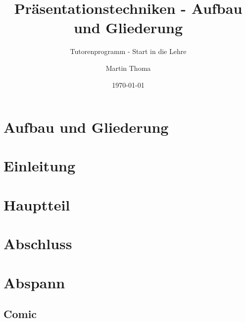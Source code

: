 \documentclass[usepdftitle=false,hyperref={pdfpagelabels=false}]{beamer}
\institute{Fakultät für Informatik}
\newcommand\titleText{Präsentationstechniken - Aufbau und Gliederung}
\begin{document}
\title{\titleText}
\subtitle{Tutorenprogramm - Start in die Lehre}
\author{Martin Thoma}
\date{\today}
\subject{Programmieren}

\frame{\titlepage}


\section{Aufbau und Gliederung}


\section{Einleitung}


\section{Hauptteil}


\section{Abschluss}


\section{Abspann}
\subsection{Comic}
\end{document}

